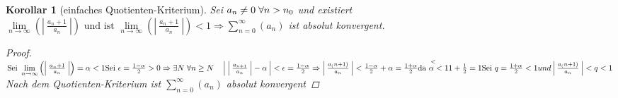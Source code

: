 \documentclass[a4paper,titlepage,oneside]{article}
\newcommand{\fa}{\ensuremath{\forall}}
\newcommand{\abs}[1]{\ensuremath{\left|\:#1\:\right|}}
\def\sp{\hspace{0,1cm}}
\newcommand{\suminf}[2]{\ensuremath{\sum_{#1= 0}^{\infty}{\left(#2\right)}}}
\renewcommand{\liminf}[2]{\ensuremath{\lim\limits_{#1 \rightarrow \infty}{\left(#2\right)}}}
\theoremstyle{thmstyle}
\newtheorem{korr}[satz]{Korollar}
\begin{document}
\begin{korr}[einfaches Quotienten-Kriterium]
Sei \(a_n \ne 0 \sp \fa n > n_0\) und existiert \(\liminf{n}{\abs{\frac{a_n+1}{a_n}}}\text{ und ist }\liminf{n}{\abs{\frac{a_n+1}{a_n}}} < 1
\Rightarrow \suminf{n}{a_n}\) ist absolut konvergent.
\begin{proof}
\begin{math}
\text{Sei } \liminf{n}{\abs{\frac{a_n+1}{a_n}}} = \alpha < 1 \\
\text{Sei } \epsilon = \frac{1 - \alpha}{2} > 0 \Rightarrow \exists N \sp \forall n \ge N \quad \abs{\abs{\frac{a_{n+1}}{a_n}} - \alpha} < \epsilon  = \frac{1-\alpha}{2}
\Rightarrow \abs{\frac{a_(n+1)}{a_n}} < \frac{1-\alpha}{2} + \alpha = \frac{1+\alpha}{2} \overset{<}{\text{da } \alpha < 1} 1+\frac{1}{2} = 1
\text{Sei } q = \frac{1 + \alpha}{2} < 1 und \abs{\frac{a_(n+1)}{a_n}} < q < 1
\end{math}
Nach dem Quotienten-Kriterium ist \suminf{n}{a_n} absolut konvergent
\end{proof}
\end{korr}
\end{document}
